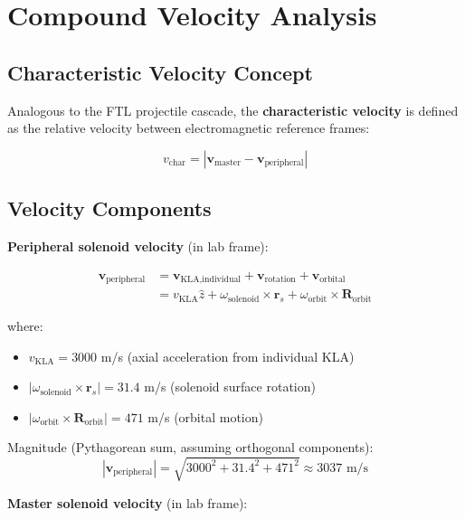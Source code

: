 \documentclass[12pt,a4paper]{article}
\begin{document}
\section{Compound Velocity Analysis}

\subsection{Characteristic Velocity Concept}

Analogous to the FTL projectile cascade, the \textbf{characteristic velocity} is defined as the relative velocity between electromagnetic reference frames:

\begin{equation}
v_{\text{char}} = \left| \mathbf{v}_{\text{master}} - \mathbf{v}_{\text{peripheral}} \right|
\end{equation}

\subsection{Velocity Components}

\textbf{Peripheral solenoid velocity} (in lab frame):

\begin{align}
\mathbf{v}_{\text{peripheral}} &= \mathbf{v}_{\text{KLA,individual}} + \mathbf{v}_{\text{rotation}} + \mathbf{v}_{\text{orbital}} \\
&= v_{\text{KLA}} \hat{z} + \omega_{\text{solenoid}} \times \mathbf{r}_s + \omega_{\text{orbit}} \times \mathbf{R}_{\text{orbit}}
\end{align}

where:
\begin{itemize}
\item $v_{\text{KLA}} = 3000$ m/s (axial acceleration from individual KLA)
\item $|\omega_{\text{solenoid}} \times \mathbf{r}_s| = 31.4$ m/s (solenoid surface rotation)
\item $|\omega_{\text{orbit}} \times \mathbf{R}_{\text{orbit}}| = 471$ m/s (orbital motion)
\end{itemize}

Magnitude (Pythagorean sum, assuming orthogonal components):
\begin{equation}
|\mathbf{v}_{\text{peripheral}}| = \sqrt{3000^2 + 31.4^2 + 471^2} \approx 3037 \text{ m/s}
\end{equation}

\textbf{Master solenoid velocity} (in lab frame):
\end{document}

